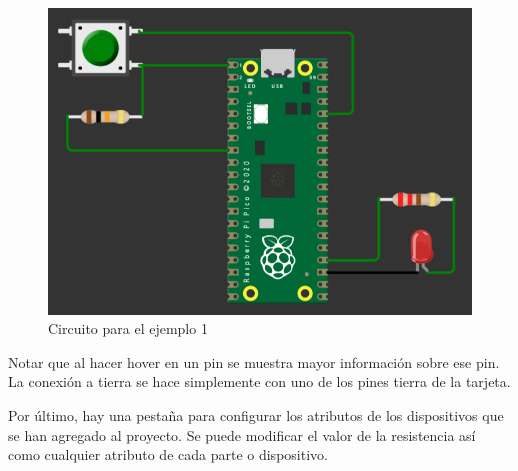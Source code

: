 \documentclass{article}
\begin{document}
    \begin{figure}[H]
        \centering
        \includegraphics[width=0.4\paperwidth]{images/wokwi-example-1-circuit}
        \caption{Circuito para el ejemplo 1}
    \end{figure}

    Notar que al hacer hover en un pin se muestra mayor información sobre ese pin. La conexión a tierra se hace simplemente con uno de los pines tierra de la tarjeta.

    \bigbreak

    Por último, hay una pestaña para configurar los atributos de los dispositivos que se han agregado al proyecto. Se puede modificar el valor de la resistencia así como cualquier atributo de cada parte o dispositivo.
\end{document}

